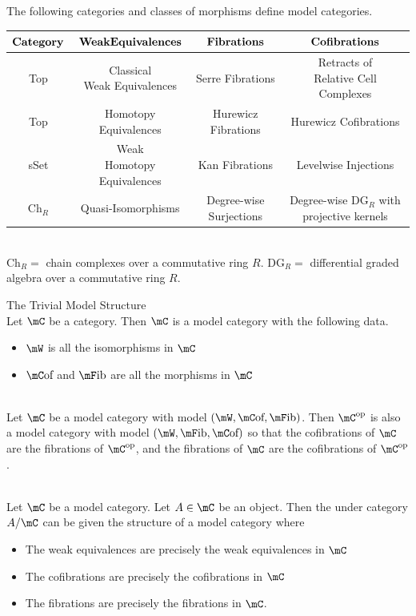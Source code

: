 \documentclass[a4paper]{article}
\begin{document}
The following categories and classes of morphisms define model categories. 
\begin{center}
\begin{tabular}{ |c|c|c|c| } 
\hline
$\bold{Category}$ & $\bold{Weak Equivalences}$ & $\bold{Fibrations}$ & $\bold{Cofibrations}$ \\
\hline
Top & \thead{Classical \\ Weak Equivalences} & Serre Fibrations & \thead{Retracts of \\ Relative Cell Complexes}\\
\hline
Top & Homotopy Equivalences & Hurewicz Fibrations & Hurewicz Cofibrations \\
\hline
sSet & \thead{Weak \\ Homotopy Equivalences} & Kan Fibrations & Levelwise Injections \\
\hline
$\text{Ch}_R$ & Quasi-Isomorphisms & Degree-wise Surjections & \thead{Degree-wise $\text{DG}_R$ \\ with projective kernels}\\
\hline
\end{tabular}
\end{center}~\\

$\text{Ch}_R=$ chain complexes over a commutative ring $R$. $\text{DG}_R=$ differential graded algebra over a commutative ring $R$. 

\begin{eg}{The Trivial Model Structure}{}\\
Let $\mC$ be a category. Then $\mC$ is a model category with the following data. 
\begin{itemize}
\item $\mW$ is all the isomorphisms in $\mC$
\item $\mC\text{of}$ and $\mF\text{ib}$ are all the morphisms in $\mC$
\end{itemize}
\end{eg}

\begin{eg}{}{}\\ Let $\mC$ be a model category with model $(\mW,\mC\text{of},\mF\text{ib})$. Then $\mC^\text{op}$ is also a model category with model $(\mW, \mF\text{ib},\mC\text{of})$ so that the cofibrations of $\mC$ are the fibrations of $\mC^\text{op}$, and the fibrations of $\mC$ are the cofibrations of $\mC^\text{op}$. 
\end{eg}

\begin{eg}{}{}\\ Let $\mC$ be a model category. Let $A\in\mC$ be an object. Then the under category $A/\mC$ can be given the structure of a model category where 
\begin{itemize}
\item The weak equivalences are precisely the weak equivalences in $\mC$
\item The cofibrations are precisely the cofibrations in $\mC$
\item The fibrations are precisely the fibrations in $\mC$. 
\end{itemize}
\end{eg}
\end{document}
